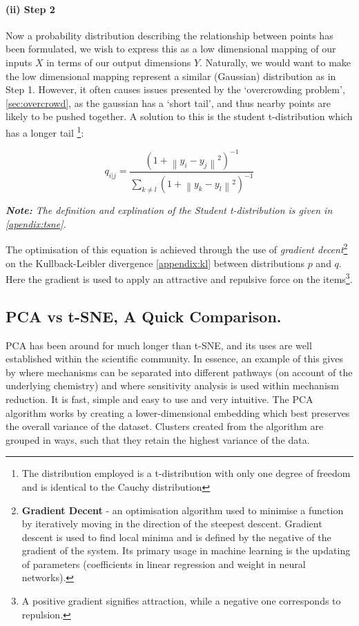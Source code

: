 \paragraph{(ii) Step 2}
Now a probability distribution describing the relationship between points has been formulated, we wish to express this as a low dimensional mapping of our inputs $X$ in terms of our output dimensions $Y$. Naturally, we would want to make the low dimensional mapping represent a similar (Gaussian) distribution as in Step 1. However, it often causes issues presented by the `overcrowding problem', \autoref{sec:overcrowd}, as the gaussian has a `short tail', and thus nearby points are likely to be pushed together. A solution to this is the student t-distribution which has a longer tail \footnote{The distribution employed is a t-distribution with only one degree of freedom and is identical to the Cauchy distribution}:

\begin{equation}
q_{i|j} =\frac{(1 + \left \| y_i - y_j \right \|^2 )^{-1}}{\sum_{k \neq l} (1 + \left \| y_k - y_l \right \|^2 )^{-1} }
\end{equation}

\emph{\textbf{Note:} The definition and explination of the Student t-distribution is given in \autoref{apendix:tsne}.
}

The optimisation of this equation is achieved through the use of \emph{gradient decent}\footnote{\textbf{Gradient Decent} - an optimisation algorithm used to minimise a function by iteratively moving in the direction of the steepest descent. Gradient descent is used to find local minima and is defined by the negative of the gradient of the system. Its primary usage in machine learning is the updating of parameters (coefficients in linear regression and weight in neural networks).}
 on the Kullback-Leibler divergence \autoref{appendix:kl} between distributions $p$ and $q$. Here the gradient is used to apply an attractive and repulsive force on the items\footnote{A positive gradient signifies attraction, while a negative one corresponds to repulsion.}.




\subsection{PCA vs t-SNE, A Quick Comparison.}

PCA has been around for much longer than t-SNE, and its uses are well established within the scientific community. In essence, an example of this gives by \cite{wyche} where mechanisms can be separated into different pathways (on account of the underlying chemistry) and \cite{kinetics} where sensitivity analysis is used within mechanism reduction. It is fast, simple and easy to use and very intuitive. The PCA algorithm works by creating a lower-dimensional embedding which best preserves the overall variance of the dataset. Clusters created from the algorithm are grouped in ways, such that they retain the highest variance of the data.

